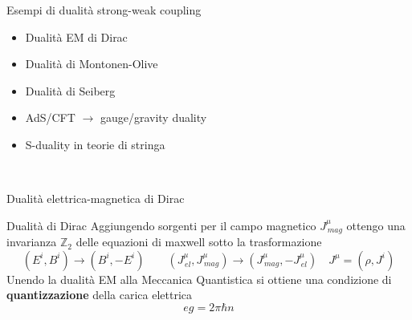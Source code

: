 \documentclass[10pt,compress,usenames,dvipsnames]{beamer}
\begin{document}
\begin{frame}{Esempi di dualità strong-weak coupling}
\vspace{-0,7cm}
\begin{itemize}
\item Dualità EM di Dirac
\item Dualità di Montonen-Olive
\item Dualità di Seiberg 
\item AdS/CFT $\rightarrow$ gauge/gravity duality 
\item S-duality in teorie di stringa
\end{itemize}

\vspace{1cm}
\\[0,5cm]

\end{frame}

\begin{frame}{Dualità elettrica-magnetica di Dirac}

\begin{block}{Dualità di Dirac}
Aggiungendo sorgenti per il campo magnetico $J_{\, mag}^{\mu}$ ottengo una invarianza $\mathbb{Z}_2$ delle equazioni di maxwell sotto la trasformazione
\begin{equation*}
 \left( {E}^i, {B}^i \right) \longrightarrow \left({B}^i, - {E}^i \right)
 \qquad \left( J_{\, el}^{\mu }, J_{\, mag}^{\mu} \right) \longrightarrow \left( 
 J_{\, mag}^{\mu},  - J_{\, el}^{\mu }
 \right)
 \quad  J^{\mu} = ( \rho , J^i)
\end{equation*}
Unendo la dualità EM alla Meccanica Quantistica si ottiene una condizione di \alert{\bfseries quantizzazione} della carica elettrica
$$
e g  = 2 \pi \hbar n
$$
\vspace{-0,3cm}
\end{block}

\vspace{0.5cm}
\end{frame}
\end{document}
